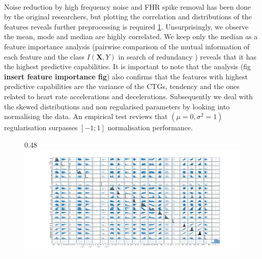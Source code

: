 \documentclass[11pt,a4paper]{article}
\begin{document}
\paragraph{}
Noise reduction by high frequency noise and FHR spike removal has been done by the original researchers, but plotting the correlation and distributions of the features reveals further preprocessing is required \ref{fig:plotmatrixX}. Unsurprisingly, we observe the mean, mode and median are highly correlated. We keep only the median as a feature importance analysis (pairwise comparison of the mutual information of each feature and the class \(I(\boldsymbol{X},Y)\) in search of redundancy \autocite{FeatureImportance}) reveals that it has the highest predictive capabilities. It is important to note that the analysis (fig \textbf{insert feature importance fig}) also confirms that the features with highest predictive capabilities are the variance of the CTGs, tendency and the ones related to heart rate accelerations and decelerations. Subsequently we deal with the skewed distributions and non regularised parameters by looking into normalising the data. An empirical test reviews that \((\mu = 0, \sigma^2 = 1)\) regularisation surpasses \([-1;1]\) normalisation performance.

\begin{figure}[htb]{0.48\textwidth}
  \centering
    \centering
    \includegraphics[width=\textwidth]{figures/plotmatrix_X.png}
  \label{fig:plotmatrixX}
\end{figure}
\end{document}
